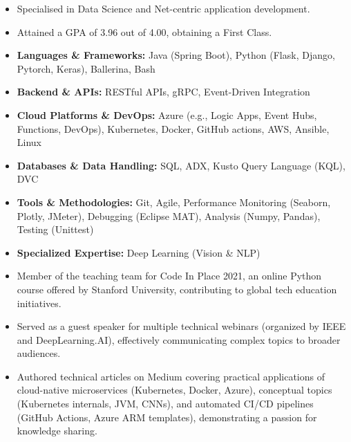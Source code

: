 \documentclass[12pt,a4paper,withhyper]{altacv}
\begin{document}
\divider{}

\begin{itemize}
    \item Specialised in Data Science and Net-centric application development.
    \item Attained a GPA of 3.96 out of 4.00, obtaining a First Class.
\end{itemize}

\medskip


\begin{itemize}
    \item \textbf{Languages \& Frameworks:} Java (Spring Boot), Python (Flask, Django, Pytorch, Keras), Ballerina, Bash
    \item \textbf{Backend \& APIs:} RESTful APIs, gRPC, Event-Driven Integration
    \item \textbf{Cloud Platforms \& DevOps:} Azure (e.g., Logic Apps, Event Hubs, Functions, DevOps), Kubernetes, Docker, GitHub actions, AWS, Ansible, Linux
    \item \textbf{Databases \& Data Handling:} SQL, ADX, Kusto Query Language (KQL), DVC
    \item \textbf{Tools \& Methodologies:} Git, Agile, Performance Monitoring (Seaborn, Plotly, JMeter), Debugging (Eclipse MAT), Analysis (Numpy, Pandas), Testing (Unittest)
    \item \textbf{Specialized Expertise:} Deep Learning (Vision \& NLP)
\end{itemize}

\medskip

\begin{itemize}
    \item Member of the teaching team for Code In Place 2021, an online Python course offered by Stanford University, contributing to global tech education initiatives.
    \item Served as a guest speaker for multiple technical webinars (organized by IEEE and DeepLearning.AI), effectively communicating complex topics to broader audiences.
    \item  Authored technical articles on Medium covering practical applications of cloud-native microservices (Kubernetes, Docker, Azure), conceptual topics (Kubernetes internals, JVM, CNNs), and automated CI/CD pipelines (GitHub Actions, Azure ARM templates), demonstrating a passion for knowledge sharing.
\end{itemize}
\end{document}
